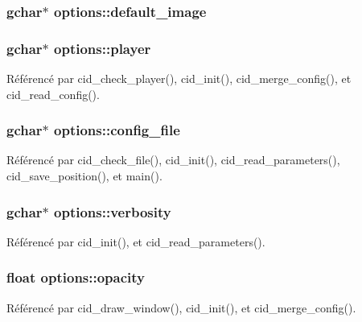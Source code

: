 \subsubsection{\setlength{\rightskip}{0pt plus 5cm}gchar$\ast$ {\bf options::default\_\-image}}\label{structoptions_cea83bdb2cdb45a5c8dc9e9e6a7cee1f}


\subsubsection{\setlength{\rightskip}{0pt plus 5cm}gchar$\ast$ {\bf options::player}}\label{structoptions_eb58208e1c390e400023a288e9616f4f}




Référencé par cid\_\-check\_\-player(), cid\_\-init(), cid\_\-merge\_\-config(), et cid\_\-read\_\-config().
\subsubsection{\setlength{\rightskip}{0pt plus 5cm}gchar$\ast$ {\bf options::config\_\-file}}\label{structoptions_f6f461b498e7e15a351ac7ff75d5de83}




Référencé par cid\_\-check\_\-file(), cid\_\-init(), cid\_\-read\_\-parameters(), cid\_\-save\_\-position(), et main().
\subsubsection{\setlength{\rightskip}{0pt plus 5cm}gchar$\ast$ {\bf options::verbosity}}\label{structoptions_345d3ac71b16e1a49b598d6f88ba0121}




Référencé par cid\_\-init(), et cid\_\-read\_\-parameters().
\subsubsection{\setlength{\rightskip}{0pt plus 5cm}float {\bf options::opacity}}\label{structoptions_d045e549b63d9ada54813d940248e122}




Référencé par cid\_\-draw\_\-window(), cid\_\-init(), et cid\_\-merge\_\-config().
